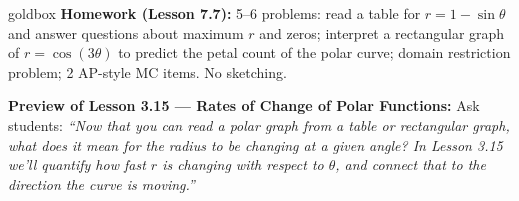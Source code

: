 \documentclass[10pt]{article}
\begin{document}
\vspace{0.08in}

\begin{skillbox}{goldbox}
\textbf{Homework (Lesson 7.7):} 5--6 problems: read a table for $r = 1 - \sin\theta$
and answer questions about maximum $r$ and zeros; interpret a rectangular graph of
$r = \cos(3\theta)$ to predict the petal count of the polar curve; domain restriction
problem; 2 AP-style MC items. No sketching.

\textbf{Preview of Lesson 3.15 --- Rates of Change of Polar Functions:}
Ask students: \textit{``Now that you can read a polar graph from a table or rectangular
graph, what does it mean for the radius to be \emph{changing} at a given angle?
In Lesson 3.15 we'll quantify how fast $r$ is changing with respect to $\theta$,
and connect that to the direction the curve is moving.''}
\end{skillbox}
\end{document}
